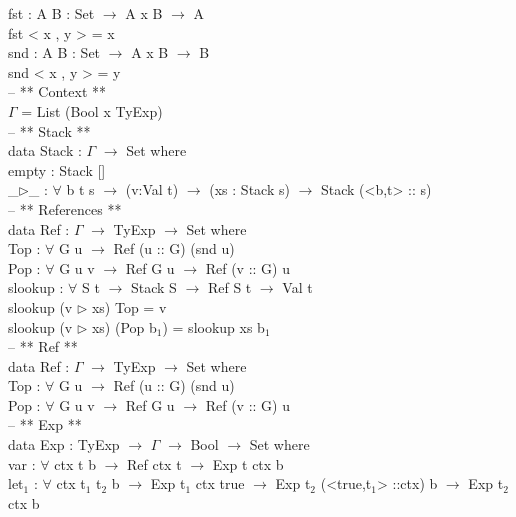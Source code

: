 \documentclass[paper=a4, fontsize=11pt]{scrartcl} %
\numberwithin{equation}{section} %
\numberwithin{figure}{section} %
\numberwithin{table}{section} %
\begin{document}
fst : {A B : Set} $\rightarrow$ A x B $\rightarrow$ A\\
fst < x , y > = x\\

snd : {A B : Set} $\rightarrow$ A x B $\rightarrow$ B\\
snd < x , y > = y\\

-- ** Context **\\

$\Gamma$ = List (Bool x TyExp)\\

-- ** Stack **\\

data Stack : $\Gamma$ $\rightarrow$ Set where\\
  empty : Stack []\\
  \_$\rhd$\_ : $\forall$ {b t s} $\rightarrow$ (v:Val t) $\rightarrow$ (xs : Stack s) $\rightarrow$ Stack (<b,t> :: s)\\

-- ** References **\\

data Ref : $\Gamma$ $\rightarrow$ TyExp $\rightarrow$ Set where\\
 Top : $\forall$ {G u} $\rightarrow$ Ref (u :: G) (snd u)\\
 Pop : $\forall$ {G u v} $\rightarrow$ Ref G u $\rightarrow$ Ref (v :: G) u\\

slookup : $\forall$ {S t} $\rightarrow$ Stack S $\rightarrow$ Ref S t $\rightarrow$ Val t\\
slookup (v $\rhd$ xs) Top = v\\
slookup (v $\rhd$ xs) (Pop b$_1$) = slookup xs b$_1$\\

-- ** Ref **\\

data Ref : $\Gamma$ $\rightarrow$ TyExp $\rightarrow$ Set where\\
 Top : $\forall$ {G u} $\rightarrow$ Ref (u :: G) (snd u)\\
 Pop : $\forall$ {G u v} $\rightarrow$ Ref G u $\rightarrow$ Ref (v :: G) u\\

-- ** Exp **\\

data Exp : TyExp $\rightarrow$ $\Gamma$ $\rightarrow$ Bool $\rightarrow$ Set where\\
  var  : $\forall$ {ctx t b} $\rightarrow$ Ref ctx t $\rightarrow$ Exp t ctx b\\
  let$_1$ : $\forall$ {ctx t$_1$ t$_2$ b} $\rightarrow$ Exp t$_1$ ctx true $\rightarrow$ Exp t$_2$ (<true,t$_1$>  ::ctx) b $\rightarrow$ Exp t$_2$ ctx b\\
\end{document}
